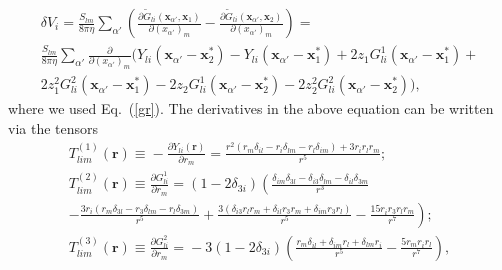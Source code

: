\begin{equation}
  \begin{aligned} %
    \delta V_i\!=\!\frac{S_{lm}}{8\pi \eta}\sum_{\alpha'}\left(\frac{\partial {\tilde G}_{li}(\bm x_{\alpha'}, \bm x_1)}{\partial (x_{\alpha'})_m}\!-\!\frac{\partial {\tilde G}_{li}(\bm x_{\alpha'}, \bm x_2)}{\partial (x_{\alpha'})_m}\right)=\\
\frac{S_{lm}}{8\pi \eta}\sum_{\alpha'} \frac{\partial}{\partial (x_{\alpha'})_m} (Y_{li}(\bm x_{\alpha'}-\bm x_2^*)-Y_{li}(\bm x_{\alpha'}-\bm x_1^*) +2z_1G^1_{li}(\bm x_{\alpha'}-\bm x_1^*) + \\
2z_1^2G^2_{li}(\bm x_{\alpha'}-\bm x_1^*)-2z_2G^1_{li}(\bm x_{\alpha'}-\bm x_2^*)-2z_2^2G^2_{li}(\bm x_{\alpha'}-\bm x_2^*) ),
\label{dfr}
\end{aligned} \end{equation}
where we used Eq.~(\ref{gr}). The derivatives in the above equation can be written via the tensors
\begin{equation} \begin{aligned} %
T^{(1)}_{lim}(\bm r)\!\equiv\! -\frac{\partial Y_{li}(\bm r)}{\partial r_m}\!=\!\frac{r^2\left(r_m\delta_{il}\!-\!r_i\delta_{lm}\!-\!r_l\delta_{im}\right)%
\!+\!%
3r_ir_lr_m}{r^5};\\
T^{(2)}_{lim}(\bm r)\!\equiv\!\frac{\partial  G^1_{li}}{\partial r_m}
=\left(1\!-\!2\delta_{3i}\right)\left(\frac{\delta_{im}\delta_{3l}\!-\!\delta_{i3}\delta_{lm}\!-\!\delta_{il}\delta_{3m}}{r^3}
\right. \\ \!\!\!\!\!\left.-\frac{3r_i(r_m\delta_{3l}\!-\!r_3\delta_{lm}\!-\!r_l\delta_{3m})}{r^5}
+ \frac{3(\delta_{i3}r_lr_m\!+\!\delta_{il}r_3r_m\!+\!\delta_{im}r_3r_l)}{r^5}\!-\!\frac{15r_ir_3r_lr_m}{r^7}
\right);\\ \!\!\!\!\!
T^{(3)}_{lim}(\bm r)\!\equiv\!\frac{\partial  G^2_{li}}{\partial r_m}
\!=\!-3\!\left(1\!-\!2\delta_{3i}\right)\left(\frac{r_m\delta_{il}\!+\delta_{im}r_l\!+\!\delta_{lm}r_i}{r^5}\!
-\!\frac{5r_mr_ir_l}{r^7}
\right),
\label{tensors}
\end{aligned}
\end{equation}
